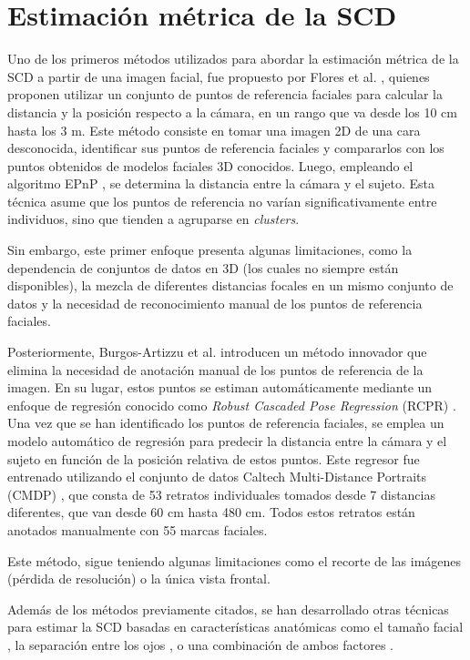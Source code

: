 \section{Estimación métrica de la SCD}

Uno de los primeros métodos utilizados para abordar la estimación métrica de la SCD a partir de una imagen facial, fue propuesto por Flores et al. \cite{28}, quienes proponen utilizar un conjunto de puntos de referencia faciales para calcular la distancia y la posición respecto a la cámara, en un rango que va desde los 10 cm hasta los 3 m.
Este método consiste en tomar una imagen 2D de una cara desconocida, identificar sus puntos de referencia faciales y compararlos con los puntos obtenidos de modelos faciales 3D conocidos. Luego, empleando el algoritmo EPnP \cite{29}, se determina la distancia entre la cámara y el sujeto. Esta técnica asume que los puntos de referencia no varían significativamente entre individuos, sino que tienden a agruparse en \textit{clusters}.

Sin embargo, este primer enfoque presenta algunas limitaciones, como la dependencia de conjuntos de datos en 3D (los cuales no siempre están disponibles), la mezcla de diferentes distancias focales en un mismo conjunto de datos y la necesidad de reconocimiento manual de los puntos de referencia faciales.

Posteriormente, Burgos-Artizzu et al. \cite{30} introducen un método innovador que elimina la necesidad de anotación manual de los puntos de referencia de la imagen. En su lugar, estos puntos se estiman automáticamente mediante un enfoque de regresión conocido como \textit{Robust Cascaded Pose Regression} (RCPR) \cite{53}. Una vez que se han identificado los puntos de referencia faciales, se emplea un modelo automático de regresión para predecir la distancia entre la cámara y el sujeto en función de la posición relativa de estos puntos. Este regresor fue entrenado utilizando el conjunto de datos Caltech Multi-Distance Portraits (CMDP) \cite{54}, que consta de 53 retratos individuales tomados desde 7 distancias diferentes, que van desde 60 cm hasta 480 cm. Todos estos retratos están anotados manualmente con 55 marcas faciales.

Este método, sigue teniendo algunas limitaciones como el recorte de las imágenes (pérdida de resolución) o la única vista frontal.

Además de los métodos previamente citados, se han desarrollado otras técnicas para estimar la SCD basadas en características anatómicas como el tamaño facial \cite{32}, la separación entre los ojos \cite{33}, o una combinación de ambos factores \cite{34}.

